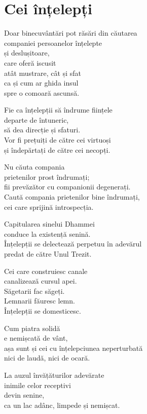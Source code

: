 
\chapter{Cei înțelepți}


Doar binecuvântări pot răsări din căutarea\\
companiei persoanelor înțelepte\\
și deslușitoare,\\
care oferă iscusit\\
atât mustrare, cât și sfat\\
ca și cum ar ghida insul\\
spre o comoară ascunsă.


Fie ca înțelepții să îndrume ființele\\
departe de întuneric,\\
să dea direcție și sfaturi.\\
Vor fi prețuiți de către cei virtuoși\\
și îndepărtați de către cei necopți.


Nu căuta compania\\
prietenilor prost îndrumați;\\
fii prevăzător cu companionii degenerați.\\
Caută compania prietenilor bine îndrumați,\\
cei care sprijină introspecția.


Capitularea sinelui Dhammei\\
conduce la existență senină.\\
Înțelepții se delectează perpetuu în adevărul\\
predat de către Unul Trezit.


Cei care construiesc canale\\
canalizează cursul apei.\\
Săgetarii fac săgeți.\\
Lemnarii făuresc lemn.\\
Înțelepții se domesticesc.


Cum piatra solidă\\
e nemișcată de vânt,\\
așa sunt și cei cu înțelepciunea neperturbată\\
nici de laudă, nici de ocară.


La auzul învățăturilor adevărate\\
inimile celor receptivi\\
devin senine,\\
ca un lac adânc, limpede și nemișcat.


